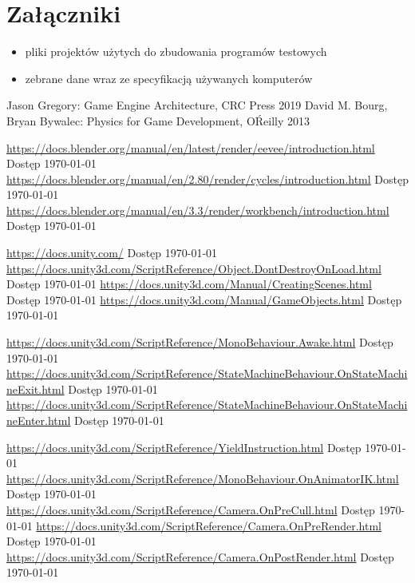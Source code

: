 \documentclass[12pt,twoside]{article}
\begin{document}
\clearpage

\section*{Załączniki}
\begin{itemize}
    \item  pliki projektów użytych do zbudowania programów testowych
    \item zebrane dane wraz ze specyfikacją używanych komputerów
    
\end{itemize}


\clearpage


\begin{thebibliography}{4}
 Jason Gregory: Game Engine Architecture, CRC Press 2019
 David M. Bourg, Bryan Bywalec: Physics for Game Development, O\'Reilly 2013

 \url{https://docs.blender.org/manual/en/latest/render/eevee/introduction.html} Dostęp \today
{} \url{https://docs.blender.org/manual/en/2.80/render/cycles/introduction.html} Dostęp \today
{} \url{https://docs.blender.org/manual/en/3.3/render/workbench/introduction.html} Dostęp \today



 \url{https://docs.unity.com/} Dostęp \today
{} \url{https://docs.unity3d.com/ScriptReference/Object.DontDestroyOnLoad.html} Dostęp \today
{} \url{https://docs.unity3d.com/Manual/CreatingScenes.html} Dostęp \today
{} \url{https://docs.unity3d.com/Manual/GameObjects.html} Dostęp \today

 \url{https://docs.unity3d.com/ScriptReference/MonoBehaviour.Awake.html} Dostęp \today
{} \url{https://docs.unity3d.com/ScriptReference/StateMachineBehaviour.OnStateMachineExit.html} Dostęp \today
{} \url{https://docs.unity3d.com/ScriptReference/StateMachineBehaviour.OnStateMachineEnter.html} Dostęp \today

 \url{https://docs.unity3d.com/ScriptReference/YieldInstruction.html} Dostęp \today
{} \url{https://docs.unity3d.com/ScriptReference/MonoBehaviour.OnAnimatorIK.html} Dostęp \today
{} \url{https://docs.unity3d.com/ScriptReference/Camera.OnPreCull.html} Dostęp \today
{} \url{https://docs.unity3d.com/ScriptReference/Camera.OnPreRender.html} Dostęp \today
{} \url{https://docs.unity3d.com/ScriptReference/Camera.OnPostRender.html} Dostęp \today


\end{thebibliography}
\end{document}
